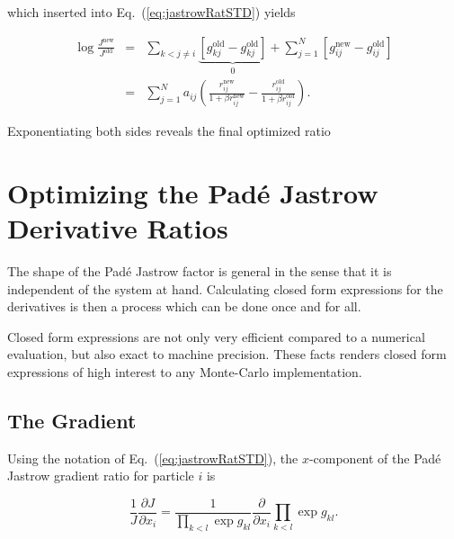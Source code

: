 which inserted into Eq.~(\ref{eq:jastrowRatSTD}) yields

\begin{eqnarray}
  \log\frac{J^\mathrm{new}}{J^\mathrm{old}} &=& \sum_{k<j \ne i}  \underbrace{\left[g^\mathrm{old}_{kj} - g^\mathrm{old}_{kj}\right]}_{0} + \sum_{j = 1}^N \left[ g^\mathrm{new}_{ij} - g^\mathrm{old}_{ij}\right] \nonumber\\
                                            &=& \sum_{j = 1}^N a_{ij}\left(\frac{r^\mathrm{new}_{ij}}{1 + \beta r^\mathrm{new}_{ij}} - \frac{r^\mathrm{old}_{ij}}{1 + \beta r^\mathrm{old}_{ij}}\right).
\end{eqnarray}

Exponentiating both sides reveals the final optimized ratio 



\section{Optimizing the Padé Jastrow Derivative Ratios}


The shape of the Padé Jastrow factor is general in the sense that it is independent of the system at hand. Calculating closed form expressions for the derivatives is then a process which can be done once and for all. 

Closed form expressions are not only very efficient compared to a numerical evaluation, but also exact to machine precision. These facts renders closed form expressions of high interest to any Monte-Carlo implementation. 

\subsection{The Gradient}

Using the notation of Eq.~(\ref{eq:jastrowRatSTD}), the $x$-component of the Padé Jastrow gradient ratio for particle $i$ is

\begin{equation}
 \frac{1}{J}\frac{\partial J}{\partial x_i} = \frac{1}{\prod_{k < l}\exp g_{kl}}\frac{\partial }{\partial x_i}\prod_{k < l}\exp g_{kl}.
\end{equation}

